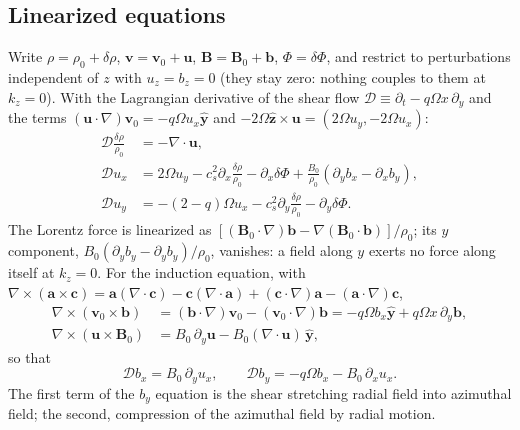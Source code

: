 \documentclass[11pt]{article}
\newcommand{\Om}{\Omega}
\begin{document}
\subsection{Linearized equations}
Write $\rho = \rho_0 + \delta\rho$, $\mathbf v = \mathbf v_0 + \mathbf u$,
$\mathbf B = \mathbf B_0 + \mathbf b$, $\Phi = \delta\Phi$, and restrict to
perturbations independent of $z$ with $u_z = b_z = 0$ (they stay zero: nothing couples to
them at $k_z = 0$). With the Lagrangian derivative of the shear flow
$\mathcal D \equiv \partial_t - q\Om x\,\partial_y$ and the terms
$(\mathbf u\cdot\nabla)\mathbf v_0 = -q\Om u_x\hat{\mathbf y}$ and
$-2\Om\hat{\mathbf z}\times\mathbf u = (2\Om u_y, -2\Om u_x)$:
\begin{align}
  \mathcal D\frac{\delta\rho}{\rho_0} &= -\nabla\cdot\mathbf u, \\
  \mathcal D u_x &= 2\Om u_y - c_s^2\partial_x\frac{\delta\rho}{\rho_0} - \partial_x\delta\Phi
     + \frac{B_0}{\rho_0}\left(\partial_y b_x - \partial_x b_y\right), \\
  \mathcal D u_y &= -(2-q)\Om u_x - c_s^2\partial_y\frac{\delta\rho}{\rho_0}
     - \partial_y\delta\Phi .
\end{align}
The Lorentz force is linearized as
$[(\mathbf B_0\cdot\nabla)\mathbf b - \nabla(\mathbf B_0\cdot\mathbf b)]/\rho_0$; its
$y$ component, $B_0(\partial_y b_y - \partial_y b_y)/\rho_0$, vanishes: a field along $y$
exerts no force along itself at $k_z = 0$. For the induction equation, with
$\nabla\times(\mathbf a\times\mathbf c) = \mathbf a(\nabla\cdot\mathbf c)
- \mathbf c(\nabla\cdot\mathbf a) + (\mathbf c\cdot\nabla)\mathbf a
- (\mathbf a\cdot\nabla)\mathbf c$,
\begin{align}
  \nabla\times(\mathbf v_0\times\mathbf b) &= (\mathbf b\cdot\nabla)\mathbf v_0
     - (\mathbf v_0\cdot\nabla)\mathbf b = -q\Om b_x\hat{\mathbf y} + q\Om x\,\partial_y\mathbf b, \\
  \nabla\times(\mathbf u\times\mathbf B_0) &= B_0\,\partial_y\mathbf u
     - B_0(\nabla\cdot\mathbf u)\,\hat{\mathbf y},
\end{align}
so that
\begin{equation}
  \mathcal D b_x = B_0\,\partial_y u_x, \qquad
  \mathcal D b_y = -q\Om b_x - B_0\,\partial_x u_x .
\end{equation}
The first term of the $b_y$ equation is the shear stretching radial field into azimuthal
field; the second, compression of the azimuthal field by radial motion.
\end{document}
